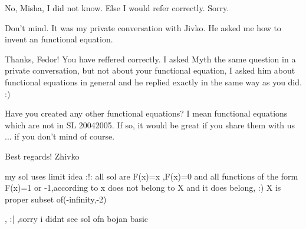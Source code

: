 \begin{solution}
	No, Misha, I did not know. Else I would refer correctly. Sorry.
\end{solution}



\begin{solution}
	Don't mind. It was my private conversation with Jivko. He asked me how to invent an functional equation.
\end{solution}



\begin{solution}
	Thanks, Fedor! You have reffered correctly. I asked Myth the same question in a private conversation, but not about your functional equation, I asked him about functional equations in general and he replied exactly in the same way as you did.  :) 


Have you created any other functional equations? I mean functional equations which are not in SL 2004\/2005. If so, it would be great if you share them with us ... if you don't mind of course.


Best regards!
Zhivko
\end{solution}



\begin{solution}
	my sol uses limit idea :!: 
 all sol are F(x)=x ,F(x)=0 and all functions of the form F(x)=1 or -1,according to x does not belong to X and it does belong, :) X is proper subset of(-infinity,-2\3)
\end{solution}



\begin{solution}
	, :| ,sorry i didnt see sol ofn bojan basic
\end{solution}



